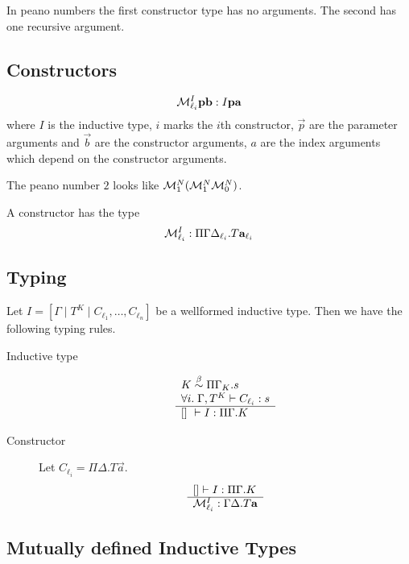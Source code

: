 In peano numbers the first constructor type has no arguments. The second has one
recursive argument.




\subsection{Constructors}

$$
    {\cal M}^I_{\ell_i} {\mathbf p} {\mathbf b}: I {\mathbf p} {\mathbf a}
$$
where $I$ is the inductive type, $i$ marks the $i$th constructor, $\vec p$ are
the parameter arguments and $\vec b$ are the constructor arguments, $a$ are the
index arguments which depend on the constructor arguments.

The peano number $2$ looks like $ {\cal M}^N_1 ({\cal M}^N_1 {\cal M}^N_0) $.

A constructor has the type
$$
    {\cal M}^I_{\ell_i} : \Pi \Gamma \Delta_{\ell_i}. T {{\mathbf a}}_{\ell_i}
$$





\subsection{Typing}

Let $I = [\Gamma \mid T^K \mid C_{\ell_1}, \ldots, C_{\ell_n}]$ be a wellformed
inductive type. Then we have the following typing rules.

\begin{description}

    \item [Inductive type]
        $$
            \rulev{
                K \; \betaeq\; \Pi \Gamma_K. s
                \\
                \forall i.\; \Gamma, T^K \vdash C_{\ell_i}: s
            }
            {
                [] \vdash I : \Pi \Gamma. K
            }
        $$


    \item [Constructor] Let $C_{\ell_i} = \Pi \Delta. T \vec a$.
        $$
        \begin{array}{l} 
            [] \vdash I: \Pi \Gamma. K
         \\ \hline 
            {\cal M}^I_{\ell_i}: \Gamma \Delta.T {\mathbf a}
         \end{array}
        $$
\end{description}






\subsection{Mutually defined Inductive Types}

